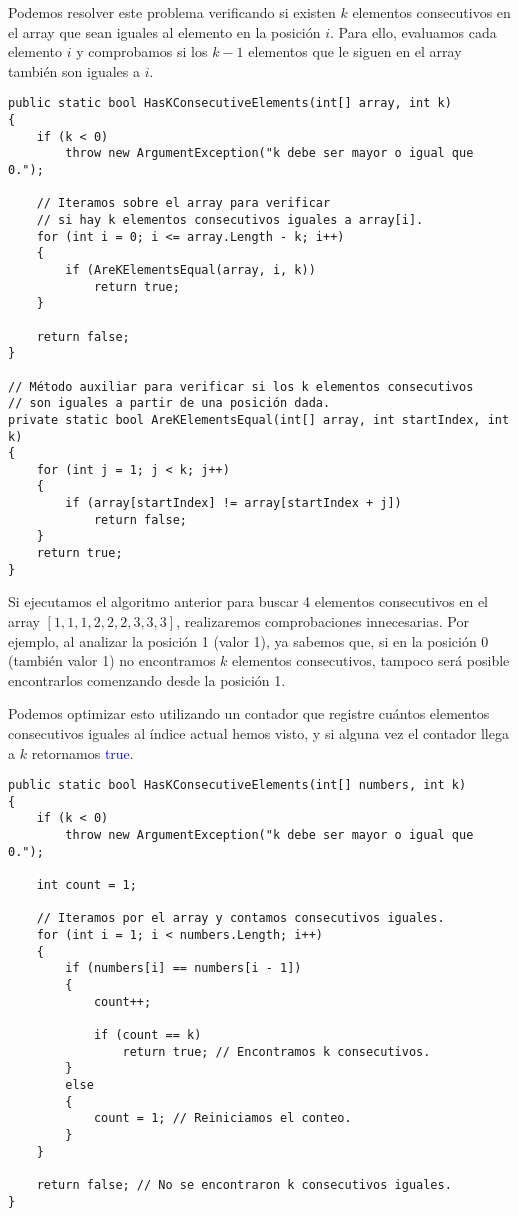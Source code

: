 Podemos resolver este problema verificando si existen \( k \) elementos consecutivos en el array que sean iguales al elemento en la posición \( i \). Para ello, evaluamos cada elemento \( i \) y comprobamos si los \( k-1 \) elementos que le siguen en el array también son iguales a \( i \).

\begin{lstlisting}
public static bool HasKConsecutiveElements(int[] array, int k)
{
    if (k < 0)
        throw new ArgumentException("k debe ser mayor o igual que 0.");
    
    // Iteramos sobre el array para verificar 
    // si hay k elementos consecutivos iguales a array[i].
    for (int i = 0; i <= array.Length - k; i++)
    {
        if (AreKElementsEqual(array, i, k))
            return true;
    }
    
    return false;
}

// Método auxiliar para verificar si los k elementos consecutivos 
// son iguales a partir de una posición dada.
private static bool AreKElementsEqual(int[] array, int startIndex, int k)
{
    for (int j = 1; j < k; j++)
    {
        if (array[startIndex] != array[startIndex + j])
            return false;
    }
    return true;
}
\end{lstlisting}

Si ejecutamos el algoritmo anterior para buscar 4 elementos consecutivos en el array \([1, 1, 1, 2, 2, 2, 3, 3, 3]\), realizaremos comprobaciones innecesarias. Por ejemplo, al analizar la posición 1 (valor 1), ya sabemos que, si en la posición 0 (también valor 1) no encontramos \( k \) elementos consecutivos, tampoco será posible encontrarlos comenzando desde la posición 1.

Podemos optimizar esto utilizando un contador que registre cuántos elementos consecutivos iguales al índice actual hemos visto, y si alguna vez el contador llega a \(k\) retornamos \textcolor{blue}{true}.

\begin{lstlisting}
public static bool HasKConsecutiveElements(int[] numbers, int k)
{
    if (k < 0)
        throw new ArgumentException("k debe ser mayor o igual que 0.");
       
    int count = 1;
    
    // Iteramos por el array y contamos consecutivos iguales.
    for (int i = 1; i < numbers.Length; i++)
    {
        if (numbers[i] == numbers[i - 1])
        {
            count++;
            
            if (count == k)
                return true; // Encontramos k consecutivos.
        }
        else
        {
            count = 1; // Reiniciamos el conteo.
        }
    }
    
    return false; // No se encontraron k consecutivos iguales.
}
\end{lstlisting}